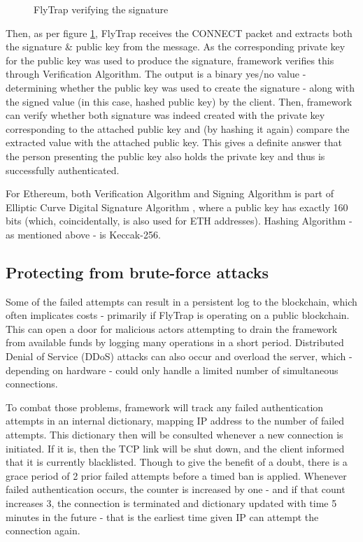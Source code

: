 \begin{figure}[h]
    \centering
    \caption{FlyTrap verifying the signature}
    \label{fig:verify}
\end{figure}

Then, as per figure \ref{fig:verify}, FlyTrap receives the CONNECT packet and extracts both the signature \& public key from the message. As the corresponding private key for the public key was used to produce the signature, framework verifies this through Verification Algorithm. The output is a binary yes/no value - determining whether the public key was used to create the signature - along with the signed value (in this case, hashed public key) by the client. Then, framework can verify whether both signature was indeed created with the private key corresponding to the attached public key and (by hashing it again) compare the extracted value with the attached public key. This gives a definite answer that the person presenting the public key also holds the private key and thus is successfully authenticated.

For Ethereum, both Verification Algorithm and Signing Algorithm is part of Elliptic Curve Digital Signature Algorithm \citep{johnson2001elliptic}, where a public key has exactly 160 bits (which, coincidentally, is also used for ETH addresses). Hashing Algorithm - as mentioned above - is Keccak-256.
\subsection{Protecting from brute-force attacks}
Some of the failed attempts can result in a persistent log to the blockchain, which often implicates costs - primarily if FlyTrap is operating on a public blockchain. This can open a door for malicious actors attempting to drain the framework from available funds by logging many operations in a short period. Distributed Denial of Service (DDoS) attacks can also occur and overload the server, which - depending on hardware - could only handle a limited number of simultaneous connections.

To combat those problems, framework will track any failed authentication attempts in an internal dictionary, mapping IP address to the number of failed attempts. This dictionary then will be consulted whenever a new connection is initiated. If it is, then the TCP link will be shut down, and the client informed that it is currently blacklisted. Though to give the benefit of a doubt, there is a grace period of 2 prior failed attempts before a timed ban is applied. Whenever failed authentication occurs, the counter is increased by one - and if that count increases 3, the connection is terminated and dictionary updated with time 5 minutes in the future - that is the earliest time given IP can attempt the connection again.
